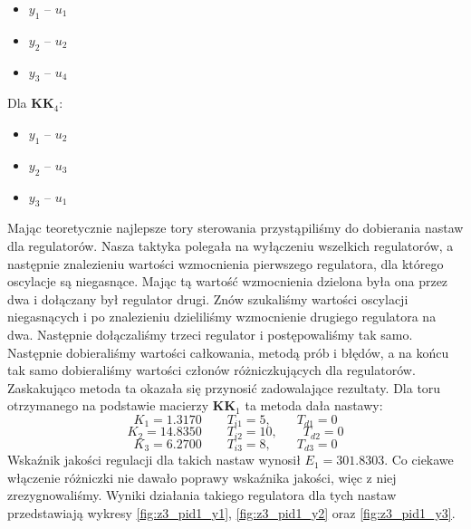 \begin{itemize}
  \item $y_1$ -- $u_1$
 \item $y_2$ -- $u_2$
 \item $y_3$ -- $u_4$
\end{itemize}
Dla $\bm{KK}_4$:
\begin{itemize}
  \item $y_1$ -- $u_2$
 \item $y_2$ -- $u_3$
 \item $y_3$ -- $u_1$
\end{itemize}
Mając teoretycznie najlepsze tory sterowania przystąpiliśmy do dobierania nastaw
dla regulatorów. Nasza taktyka polegała na wyłączeniu wszelkich regulatorów, a
następnie znalezieniu wartości wzmocnienia pierwszego regulatora, dla którego
oscylacje są niegasnące. Mając tą wartość wzmocnienia dzielona była ona przez
dwa i dołączany był regulator drugi. Znów szukaliśmy wartości oscylacji niegasnących
i po znalezieniu dzieliliśmy wzmocnienie drugiego regulatora na dwa. Następnie
dołączaliśmy trzeci regulator i postępowaliśmy tak samo. Następnie dobieraliśmy
wartości całkowania, metodą prób i błędów, a na końcu tak samo dobieraliśmy
wartości członów różniczkujących dla regulatorów. Zaskakująco metoda ta okazała się
przynosić zadowalające rezultaty. Dla toru otrzymanego na podstawie macierzy $\bm{KK}_1$
ta metoda dała nastawy:
\begin{equation}
  K_1 = \num{1.3170} \qquad T_{i1} = 5, \qquad T_{d1} = 0 \nonumber
\end{equation}
\begin{equation}
  K_2 = \num{14.8350} \qquad T_{i2} = 10, \qquad T_{d2} = 0
\end{equation}
\begin{equation}
  K_3 = \num{6.2700} \qquad T_{i3} = 8, \qquad T_{d3} = 0 \nonumber
\end{equation}
Wskaźnik jakości regulacji dla takich nastaw wynosił $E_1 = \num{301.8303}$.
Co ciekawe włączenie różniczki nie dawało poprawy wskaźnika jakości, więc z niej
zrezygnowaliśmy.
Wyniki działania takiego regulatora dla tych nastaw przedstawiają wykresy \ref{fig:z3_pid1_y1},
\ref{fig:z3_pid1_y2} oraz \ref{fig:z3_pid1_y3}.

